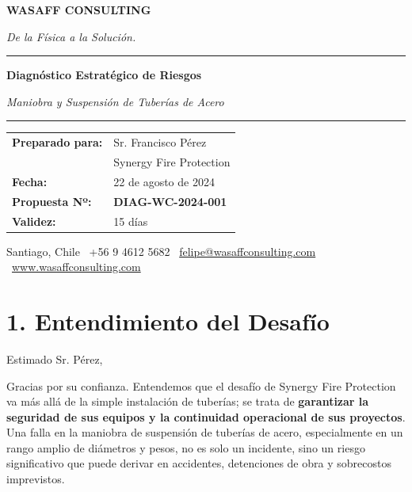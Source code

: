 \documentclass[a4paper,11pt]{article}
\begin{document}
\begin{titlepage}
    \centering
    \vspace*{1cm}
    {\scshape\Huge\bfseries WASAFF CONSULTING \par}
    \vspace{0.2cm}
    {\large\itshape De la Física a la Solución.\par}
    \vspace{2cm}
    \rule{\linewidth}{0.8pt}
    \vspace{0.4cm}
    {\Huge\bfseries Diagnóstico Estratégico de Riesgos\par}
    \vspace{0.1cm}
    {\large\itshape Maniobra y Suspensión de Tuberías de Acero\par}
    \rule{\linewidth}{0.2pt}
    \vspace{2.5cm}
    
    \begin{tabular}{ll}
        \textbf{Preparado para:} & Sr. Francisco Pérez \\
                                & Synergy Fire Protection \\
        \textbf{Fecha:}           & 22 de agosto de 2024 \\
        \textbf{Propuesta Nº:}    & \textbf{DIAG-WC-2024-001} \\
        \textbf{Validez:}         & 15 días \\
    \end{tabular}
    
    \vfill
    {\small Santiago, Chile \textbar\ +56 9 4612 5682 \textbar\ \href{mailto:felipe@wasaffconsulting.com}{felipe@wasaffconsulting.com} \textbar\ \url{www.wasaffconsulting.com}}
\end{titlepage}

\section*{1. Entendimiento del Desafío}
Estimado Sr. Pérez,

Gracias por su confianza. Entendemos que el desafío de Synergy Fire Protection va más allá de la simple instalación de tuberías; se trata de \textbf{garantizar la seguridad de sus equipos y la continuidad operacional de sus proyectos}. Una falla en la maniobra de suspensión de tuberías de acero, especialmente en un rango amplio de diámetros y pesos, no es solo un incidente, sino un riesgo significativo que puede derivar en accidentes, detenciones de obra y sobrecostos imprevistos.
\end{document}
